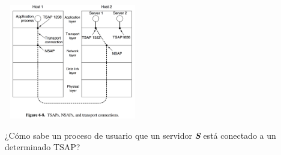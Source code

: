 \documentclass[10pt,a4paper]{report}
\begin{document}
\begin{center}
	\includegraphics[width=6cm, height=5cm]{./imagenes/tsap.png} 
\end{center}

\par ¿Cómo sabe un proceso de usuario que un servidor \textbf{\textit{S}} está 
conectado a un determinado TSAP?
\end{document}
